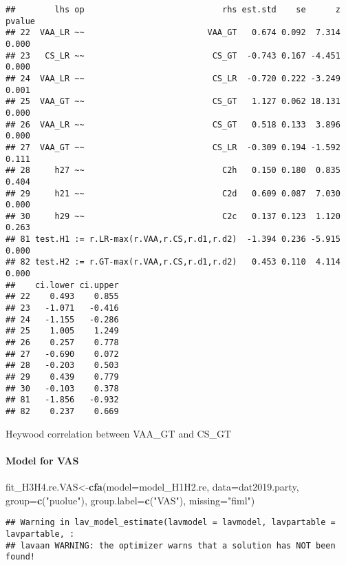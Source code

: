 \documentclass[
]{article}
\newenvironment{Shaded}{\begin{snugshade}}{\end{snugshade}}
\newcommand{\DataTypeTok}[1]{\textcolor[rgb]{0.13,0.29,0.53}{#1}}
\newcommand{\KeywordTok}[1]{\textcolor[rgb]{0.13,0.29,0.53}{\textbf{#1}}}
\newcommand{\NormalTok}[1]{#1}
\newcommand{\StringTok}[1]{\textcolor[rgb]{0.31,0.60,0.02}{#1}}
\begin{document}
\begin{verbatim}
##        lhs op                            rhs est.std    se      z pvalue
## 22  VAA_LR ~~                         VAA_GT   0.674 0.092  7.314  0.000
## 23   CS_LR ~~                          CS_GT  -0.743 0.167 -4.451  0.000
## 24  VAA_LR ~~                          CS_LR  -0.720 0.222 -3.249  0.001
## 25  VAA_GT ~~                          CS_GT   1.127 0.062 18.131  0.000
## 26  VAA_LR ~~                          CS_GT   0.518 0.133  3.896  0.000
## 27  VAA_GT ~~                          CS_LR  -0.309 0.194 -1.592  0.111
## 28     h27 ~~                            C2h   0.150 0.180  0.835  0.404
## 29     h21 ~~                            C2d   0.609 0.087  7.030  0.000
## 30     h29 ~~                            C2c   0.137 0.123  1.120  0.263
## 81 test.H1 := r.LR-max(r.VAA,r.CS,r.d1,r.d2)  -1.394 0.236 -5.915  0.000
## 82 test.H2 := r.GT-max(r.VAA,r.CS,r.d1,r.d2)   0.453 0.110  4.114  0.000
##    ci.lower ci.upper
## 22    0.493    0.855
## 23   -1.071   -0.416
## 24   -1.155   -0.286
## 25    1.005    1.249
## 26    0.257    0.778
## 27   -0.690    0.072
## 28   -0.203    0.503
## 29    0.439    0.779
## 30   -0.103    0.378
## 81   -1.856   -0.932
## 82    0.237    0.669
\end{verbatim}

Heywood correlation between VAA\_GT and CS\_GT

\newpage

\hypertarget{model-for-vas}{%
\paragraph{Model for VAS}\label{model-for-vas}}

\begin{Shaded}
\begin{Highlighting}[]
\NormalTok{fit_H3H4.re.VAS<-}\KeywordTok{cfa}\NormalTok{(}\DataTypeTok{model=}\NormalTok{model_H1H2.re,}
                    \DataTypeTok{data=}\NormalTok{dat2019.party,}
                    \DataTypeTok{group=}\KeywordTok{c}\NormalTok{(}\StringTok{"puolue"}\NormalTok{),}
                    \DataTypeTok{group.label=}\KeywordTok{c}\NormalTok{(}\StringTok{"VAS"}\NormalTok{),}
                    \DataTypeTok{missing=}\StringTok{"fiml"}\NormalTok{)}
\end{Highlighting}
\end{Shaded}

\begin{verbatim}
## Warning in lav_model_estimate(lavmodel = lavmodel, lavpartable = lavpartable, :
## lavaan WARNING: the optimizer warns that a solution has NOT been found!
\end{verbatim}
\end{document}
